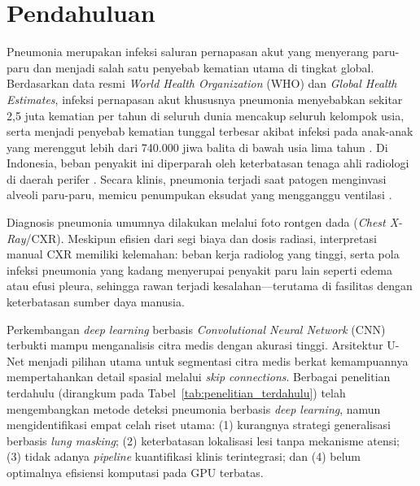 \documentclass[12pt,a4paper,twocolumn]{article}
\newcommand{\parencite}[1]{\citep{#1}}
\begin{document}
\section{Pendahuluan}

Pneumonia merupakan infeksi saluran pernapasan akut yang menyerang paru-paru
dan menjadi salah satu penyebab kematian utama di tingkat global. Berdasarkan
data resmi \textit{World Health Organization} (WHO) dan \textit{Global Health Estimates},
infeksi pernapasan akut khususnya pneumonia menyebabkan sekitar 2,5 juta kematian per tahun
di seluruh dunia mencakup seluruh kelompok usia, serta menjadi penyebab kematian tunggal
terbesar akibat infeksi pada anak-anak yang merenggut lebih dari 740.000 jiwa balita
di bawah usia lima tahun \parencite{who2024}. Di Indonesia, beban penyakit ini diperparah
oleh keterbatasan tenaga ahli
radiologi di daerah perifer \parencite{said2018}. Secara klinis, pneumonia
terjadi saat patogen menginvasi alveoli paru-paru, memicu penumpukan eksudat
yang mengganggu ventilasi \parencite{seth2022}.

Diagnosis pneumonia umumnya dilakukan melalui foto rontgen dada (\textit{Chest
X-Ray}/CXR). Meskipun efisien dari segi biaya dan dosis radiasi, interpretasi
manual CXR memiliki kelemahan: beban kerja radiolog yang tinggi, serta pola
infeksi pneumonia yang kadang menyerupai penyakit paru lain seperti edema atau
efusi pleura, sehingga rawan terjadi kesalahan---terutama di fasilitas dengan
keterbatasan sumber daya manusia.

Perkembangan \textit{deep learning} berbasis \textit{Convolutional Neural
Network} (CNN) terbukti mampu menganalisis citra medis dengan akurasi tinggi.
Arsitektur U-Net \parencite{ronneberger2015unet} menjadi pilihan utama untuk
segmentasi citra medis berkat kemampuannya mempertahankan detail spasial
melalui \textit{skip connections}. Berbagai penelitian terdahulu (dirangkum
pada Tabel~\ref{tab:penelitian_terdahulu}) telah mengembangkan metode deteksi
pneumonia berbasis \textit{deep learning}, namun mengidentifikasi empat celah
riset utama: (1) kurangnya strategi generalisasi berbasis \textit{lung
masking}; (2) keterbatasan lokalisasi lesi tanpa mekanisme atensi; (3) tidak
adanya \textit{pipeline} kuantifikasi klinis terintegrasi; dan (4) belum
optimalnya efisiensi komputasi pada GPU terbatas.
\end{document}
